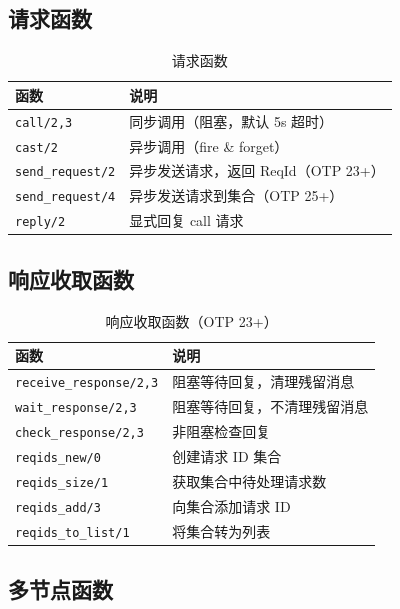 \documentclass[a4paper,11pt]{article}
\begin{document}
\subsection{请求函数}

\begin{table}[H]
\centering
\small
\begin{tabular}{@{}lp{7cm}@{}}
\toprule
\textbf{函数} & \textbf{说明} \\
\midrule
\texttt{call/2,3} & 同步调用（阻塞，默认 5s 超时） \\
\texttt{cast/2} & 异步调用（fire \& forget） \\
\texttt{send\_request/2} & 异步发送请求，返回 ReqId（OTP 23+） \\
\texttt{send\_request/4} & 异步发送请求到集合（OTP 25+） \\
\texttt{reply/2} & 显式回复 call 请求 \\
\bottomrule
\end{tabular}
\caption{请求函数}
\end{table}

\subsection{响应收取函数}

\begin{table}[H]
\centering
\small
\begin{tabular}{@{}lp{7cm}@{}}
\toprule
\textbf{函数} & \textbf{说明} \\
\midrule
\texttt{receive\_response/2,3} & 阻塞等待回复，清理残留消息 \\
\texttt{wait\_response/2,3} & 阻塞等待回复，不清理残留消息 \\
\texttt{check\_response/2,3} & 非阻塞检查回复 \\
\texttt{reqids\_new/0} & 创建请求 ID 集合 \\
\texttt{reqids\_size/1} & 获取集合中待处理请求数 \\
\texttt{reqids\_add/3} & 向集合添加请求 ID \\
\texttt{reqids\_to\_list/1} & 将集合转为列表 \\
\bottomrule
\end{tabular}
\caption{响应收取函数（OTP 23+）}
\end{table}

\subsection{多节点函数}
\end{document}
